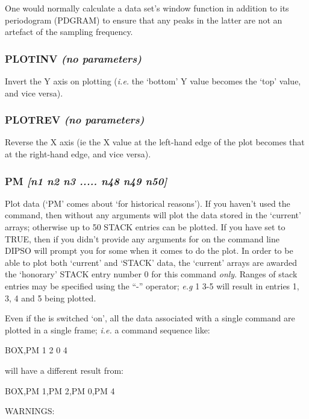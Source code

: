\documentclass[twoside,11pt,noabs,nolof]{starlink}
\providecommand{\dipcom}[3]{\subsubsection*{\label{COM:#1}\textbf{#1} \emph{#2}}}
\begin{document}
One would normally calculate a data set's window function in addition
to its periodogram (PDGRAM) to ensure that any peaks in the latter are
not an artefact of the sampling frequency.

\dipcom{PLOTINV}{(no parameters)}{Causes the Y axis of subsequent plots to be inverted}
Invert the Y axis on plotting (\emph{i.e.} the `bottom' Y value becomes
the `top' value, and vice versa).

\dipcom{PLOTREV}{(no parameters)}{Causes the X axis of subsequent plots to be reversed}
Reverse the X axis (ie the X value at the left-hand edge of the plot
becomes that at the right-hand edge, and vice versa).

\dipcom{PM}{[n1 n2 n3 ..... n48 n49 n50]}{Plots a data array}
Plot data (`PM' comes about `for historical reasons'). If you haven't
used the   command, then   without any arguments will plot the
data stored in the `current' arrays; otherwise up to 50 STACK entries
can be plotted. If you have set   to TRUE, then if you didn't
provide any arguments for   on the command line DIPSO will prompt you
for some when it comes to do the plot. In order to be able to plot
both `current' and `STACK' data, the `current' arrays are awarded the
`honorary' STACK entry number 0 for this command \emph{only}. Ranges of
stack entries may be specified using the ``-'' operator; \emph{e.g}   1 3-5
will result in entries 1, 3, 4 and 5 being plotted.

Even if the   is switched `on', all the data associated with a single 
command are plotted in a single frame; \emph{i.e.} a command sequence like:

\begin{terminalv}
BOX,PM 1 2 0 4
\end{terminalv}

will have a different result from:

\begin{terminalv}
BOX,PM 1,PM 2,PM 0,PM 4
\end{terminalv}

WARNINGS:
\end{document}
